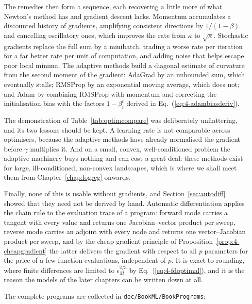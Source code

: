 The remedies then form a sequence, each recovering a little more of what
Newton's method has and gradient descent lacks.  Momentum accumulates a
discounted history of gradients, amplifying consistent directions by
$1/(1-\beta)$ and cancelling oscillatory ones, which improves the rate from
$\kappa$ to $\sqrt{\kappa}$.  Stochastic gradients replace the full sum by a
minibatch, trading a worse rate per iteration for a far better rate per unit
of computation, and adding noise that helps escape poor local minima.  The
adaptive methods build a diagonal estimate of curvature from the second moment
of the gradient: AdaGrad by an unbounded sum, which eventually stalls; RMSProp
by an exponential moving average, which does not; and Adam by combining
RMSProp with momentum and correcting the initialisation bias with the factors
$1-\beta_i^{t}$ derived in Eq.~(\ref{eq:4-adambiasderiv}).

The demonstration of Table~\ref{tab:optimcompare} was deliberately
unflattering, and its two lessons should be kept.  A learning rate is not
comparable across optimisers, because the adaptive methods have already
normalised the gradient before $\gamma$ multiplies it.  And on a small, convex,
well-conditioned problem the adaptive machinery buys nothing and can cost a
great deal: these methods exist for large, ill-conditioned, non-convex
landscapes, which is where we shall meet them from Chapter~\ref{chap:logreg} onwards.

Finally, none of this is usable without gradients, and
Section~\ref{sec:autodiff} showed that they need not be derived by hand.
Automatic differentiation applies the chain rule to the evaluation trace of a
program: forward mode carries a tangent with every value and returns one
Jacobian--vector product per sweep, reverse mode carries an adjoint with
every node and returns one vector--Jacobian product per sweep, and by the
cheap gradient principle of Proposition~\ref{prop:4-cheapgradient} the latter
delivers the gradient with respect to all $p$ parameters for the price of a
few function evaluations, independent of $p$.  It is exact to rounding, where
finite differences are limited to $\epsilon_M^{2/3}$ by
Eq.~(\ref{eq:4-fdoptimal}), and it is the reason the models of the later
chapters can be written down at all.

The complete programs are collected in \texttt{doc/BookML/BookPrograms}:

